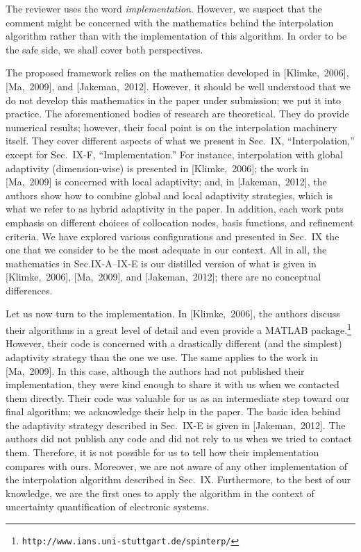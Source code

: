 \begin{authors}
The reviewer uses the word \emph{implementation}. However, we suspect that the
comment might be concerned with the mathematics behind the interpolation
algorithm rather than with the implementation of this algorithm. In order to be
the safe side, we shall cover both perspectives.

The proposed framework relies on the mathematics developed in [Klimke,~2006],
[Ma,~2009], and [Jakeman,~2012]. However, it should be well understood that we
do not develop this mathematics in the paper under submission; we put it into
practice. The aforementioned bodies of research are theoretical. They do provide
numerical results; however, their focal point is on the interpolation machinery
itself. They cover different aspects of what we present in Sec.~IX,
``Interpolation,'' except for Sec.~IX-F, ``Implementation.'' For instance,
interpolation with global adaptivity (dimension-wise) is presented in
[Klimke,~2006]; the work in [Ma,~2009] is concerned with local adaptivity; and,
in [Jakeman,~2012], the authors show how to combine global and local adaptivity
strategies, which is what we refer to as hybrid adaptivity in the paper. In
addition, each work puts emphasis on different choices of collocation nodes,
basis functions, and refinement criteria. We have explored various
configurations and presented in Sec.~IX the one that we consider to be the most
adequate in our context. All in all, the mathematics in Sec.IX-A--IX-E is our
distilled version of what is given in [Klimke,~2006], [Ma,~2009], and
[Jakeman,~2012]; there are no conceptual differences.

Let us now turn to the implementation. In [Klimke,~2006], the authors discuss
their algorithms in a great level of detail and even provide a MATLAB
package.\footnote{\texttt{http://www.ians.uni-stuttgart.de/spinterp/}} However,
their code is concerned with a drastically different (and the simplest)
adaptivity strategy than the one we use. The same applies to the work in
[Ma,~2009]. In this case, although the authors had not published their
implementation, they were kind enough to share it with us when we contacted them
directly. Their code was valuable for us as an intermediate step toward our
final algorithm; we acknowledge their help in the paper. The basic idea behind
the adaptivity strategy described in Sec.~IX-E is given in [Jakeman,~2012]. The
authors did not publish any code and did not rely to us when we tried to contact
them. Therefore, it is not possible for us to tell how their implementation
compares with ours. Moreover, we are not aware of any other implementation of
the interpolation algorithm described in Sec.~IX. Furthermore, to the best of
our knowledge, we are the first ones to apply the algorithm in the context of
uncertainty quantification of electronic systems.


\end{authors}
